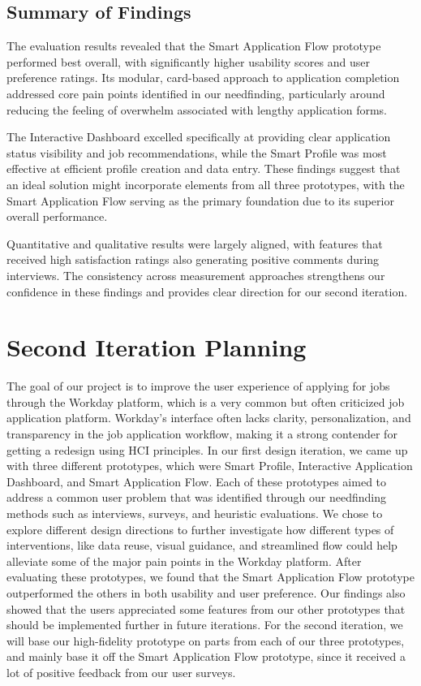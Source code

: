 \documentclass[
	letterpaper, %
]{jdf}
\begin{document}
\begin{sloppypar}
\subsection{Summary of Findings}

The evaluation results revealed that the Smart Application Flow prototype performed best overall, with significantly higher usability scores and user preference ratings. Its modular, card-based approach to application completion addressed core pain points identified in our needfinding, particularly around reducing the feeling of overwhelm associated with lengthy application forms.

The Interactive Dashboard excelled specifically at providing clear application status visibility and job recommendations, while the Smart Profile was most effective at efficient profile creation and data entry. These findings suggest that an ideal solution might incorporate elements from all three prototypes, with the Smart Application Flow serving as the primary foundation due to its superior overall performance.

Quantitative and qualitative results were largely aligned, with features that received high satisfaction ratings also generating positive comments during interviews. The consistency across measurement approaches strengthens our confidence in these findings and provides clear direction for our second iteration.

\newpage
\section{Second Iteration Planning}

The goal of our project is to improve the user experience of applying for jobs through the Workday platform, which is a very common but often criticized job application platform. Workday’s interface often lacks clarity, personalization, and transparency in the job application workflow, making it a strong contender for getting a redesign using HCI principles. In our first design iteration, we came up with three different prototypes, which were Smart Profile, Interactive Application Dashboard, and Smart Application Flow. Each of these prototypes aimed to address a common user problem that was identified through our needfinding methods such as interviews, surveys, and heuristic evaluations. We chose to explore different design directions to further investigate how different types of interventions, like data reuse, visual guidance, and streamlined flow could help alleviate some of the major pain points in the Workday platform. After evaluating these prototypes, we found that the Smart Application Flow prototype outperformed the others in both usability and user preference. Our findings also showed that the users appreciated some features from our other prototypes that should be implemented further in future iterations. For the second iteration, we will base our high-fidelity prototype on parts from each of our three prototypes, and mainly base it off the Smart Application Flow prototype, since it received a lot of positive feedback from our user surveys. 


\end{sloppypar}
\end{document}
